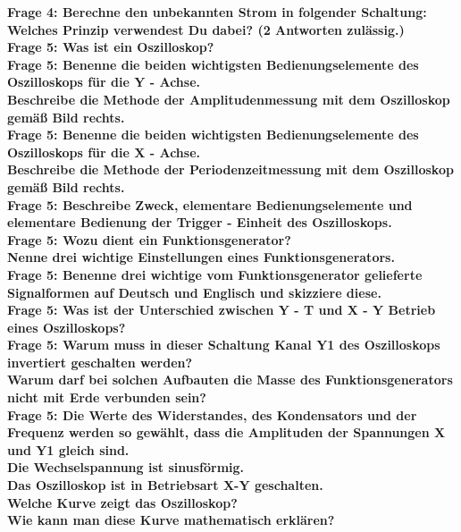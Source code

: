 \documentclass[11pt,a4paper]{scrartcl}
\begin{document}
\textbf{Frage 4: Berechne den unbekannten Strom in folgender Schaltung: Welches Prinzip verwendest Du dabei? (2 Antworten zulässig.)}\\
\textbf{Frage 5: Was ist ein Oszilloskop?}\\
\textbf{Frage 5: Benenne die beiden wichtigsten Bedienungselemente des Oszilloskops für die Y - Achse.\\
Beschreibe die Methode der Amplitudenmessung mit dem Oszilloskop gemäß Bild rechts.}\\
\textbf{Frage 5: Benenne die beiden wichtigsten Bedienungselemente des Oszilloskops für die X - Achse.\\
Beschreibe die Methode der Periodenzeitmessung mit dem Oszilloskop gemäß Bild rechts.}\\
\textbf{Frage 5: Beschreibe Zweck, elementare Bedienungselemente und elementare Bedienung der Trigger - Einheit des Oszilloskops.}\\
\textbf{Frage 5: Wozu dient ein Funktionsgenerator?\\
Nenne drei wichtige Einstellungen eines Funktionsgenerators.}\\
\textbf{Frage 5: Benenne drei wichtige vom Funktionsgenerator gelieferte Signalformen auf Deutsch und Englisch und skizziere diese.}\\
\textbf{Frage 5: Was ist der Unterschied zwischen Y - T und X - Y Betrieb eines Oszilloskops?}\\
\textbf{Frage 5: Warum muss in dieser Schaltung Kanal Y1 des Oszilloskops invertiert geschalten werden?\\
Warum darf bei solchen Aufbauten die Masse des Funktionsgenerators nicht mit Erde verbunden sein?}\\
\textbf{Frage 5: Die Werte des Widerstandes, des Kondensators und der Frequenz werden so gewählt, dass die Amplituden der Spannungen X und Y1 gleich sind.\\
Die Wechselspannung ist sinusförmig.\\
Das Oszilloskop ist in Betriebsart X-Y geschalten.\\
Welche Kurve zeigt das Oszilloskop?\\
Wie kann man diese Kurve mathematisch erklären?}\\
\end{document}
